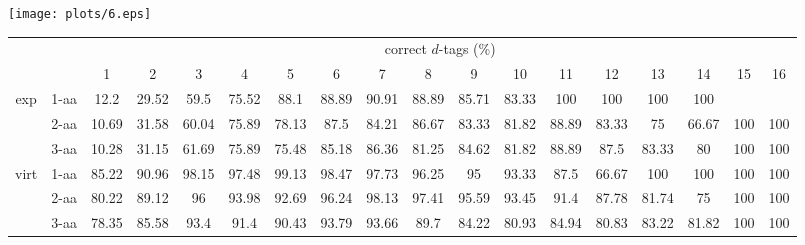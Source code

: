 \documentclass{article}
\begin{document}
\texttt{[image: plots/6.eps]}\begin{table}[h]\tiny
\vspace{3mm}
{\centering
\begin{center}
\begin{tabular}{|c|l|c|c|c|c|c|c|c|c|c|c|c|c|c|c|c|c|}
  \hline
  \multicolumn{2}{|c|}{ } & \multicolumn{ 16 }{|c|}{ correct $d$-tags (\%)} \\
  \cline{3- 18}
  \multicolumn{2}{|c|}{ }  & 1 & 2 & 3 & 4 & 5 & 6 & 7 & 8 & 9 & 10 & 11 & 12 & 13 & 14 & 15 & 16\\
  \hline
  \multirow{3}{*}{exp}
&  1-aa  & 12.2 & 29.52 & 59.5 & 75.52 & 88.1 & 88.89 & 90.91 & 88.89 & 85.71 & 83.33 & 100 & 100 & 100 & 100 &  & \\&  2-aa  & 10.69 & 31.58 & 60.04 & 75.89 & 78.13 & 87.5 & 84.21 & 86.67 & 83.33 & 81.82 & 88.89 & 83.33 & 75 & 66.67 & 100 & 100\\&  3-aa  & 10.28 & 31.15 & 61.69 & 75.89 & 75.48 & 85.18 & 86.36 & 81.25 & 84.62 & 81.82 & 88.89 & 87.5 & 83.33 & 80 & 100 & 100\\ \hline
  \multirow{3}{*}{virt} 
&  1-aa  & 85.22 & 90.96 & 98.15 & 97.48 & 99.13 & 98.47 & 97.73 & 96.25 & 95 & 93.33 & 87.5 & 66.67 & 100 & 100 & 100 & 100\\&  2-aa  & 80.22 & 89.12 & 96 & 93.98 & 92.69 & 96.24 & 98.13 & 97.41 & 95.59 & 93.45 & 91.4 & 87.78 & 81.74 & 75 & 100 & 100\\&  3-aa  & 78.35 & 85.58 & 93.4 & 91.4 & 90.43 & 93.79 & 93.66 & 89.7 & 84.22 & 80.93 & 84.94 & 80.83 & 83.22 & 81.82 & 100 & 100\\ \hline
\end{tabular}
\end{center}
\par}
\centering
\vspace{3mm}
\label{table:correct-vs-proper-d-tags}
\end{table}
\end{document}
